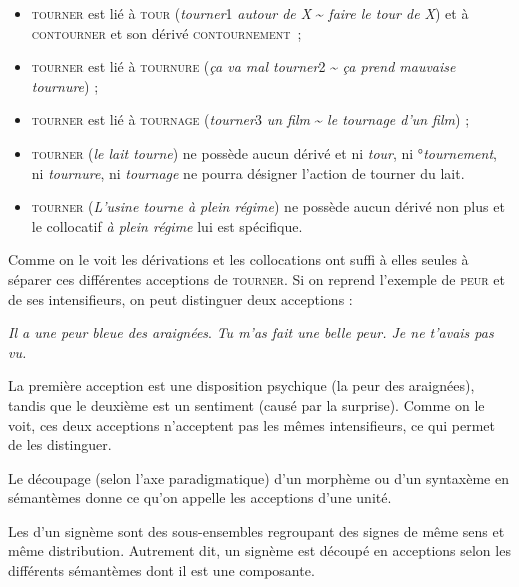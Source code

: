 \begin{itemize}
\item \textsc{tourner} est lié à \textsc{tour} (\textit{tourner}1 \textit{autour de X} {\textasciitilde} \textit{faire le tour de X}) et à \textsc{contourner} et son dérivé \textsc{contournement~};
\item \textsc{tourner} est lié à \textsc{tournure} (\textit{ça va mal tourner}2 {\textasciitilde} \textit{ça prend mauvaise tournure}) ;
\item \textsc{tourner} est lié à \textsc{tournage} (\textit{tourner}3 \textit{un film} {\textasciitilde} \textit{le tournage d’un film}) ;
\item \textsc{tourner} (\textit{le lait tourne}) ne possède aucun dérivé et ni \textit{tour}, ni °\textit{tournement}, ni \textit{tournure}, ni \textit{tournage} ne pourra désigner l’action de tourner du lait.
\item \textsc{tourner} (\textit{L’usine tourne à plein régime}) ne possède aucun dérivé non plus et le collocatif \textit{à plein régime} lui est spécifique.
\end{itemize}

Comme on le voit les dérivations et les collocations ont suffi à elles seules à séparer ces différentes acceptions de \textsc{tourner}. Si on reprend l’exemple de \textsc{peur} et de ses intensifieurs, on peut distinguer deux acceptions :

\ea
    \ea \textit{Il a une peur bleue des araignées}.
    \ex \textit{Tu m’as fait une belle peur. Je ne t’avais pas vu.}
\z
\ex
{}
\z
\z

La première acception est une disposition psychique (la peur des araignées), tandis que le deuxième est un sentiment (causé par la surprise). Comme on le voit, ces deux acceptions n’acceptent pas les mêmes intensifieurs, ce qui permet de les distinguer.

Le découpage (selon l’axe paradigmatique) d’un morphème ou d’un syntaxème en sémantèmes donne ce qu’on appelle les acceptions d’une unité.

{Les  d’un signème sont des sous-ensembles regroupant des signes de même sens et même distribution. Autrement dit, un signème est découpé en acceptions selon les différents sémantèmes dont il est une composante.}

